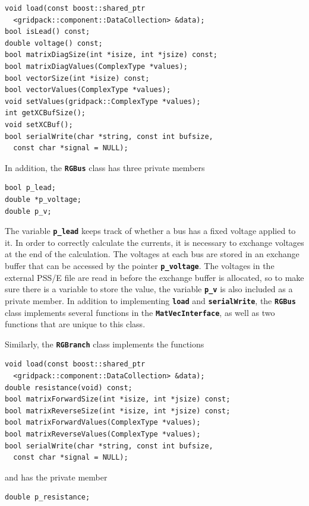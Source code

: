 {
\color{red}
\begin{Verbatim}[fontseries=b]
void load(const boost::shared_ptr
  <gridpack::component::DataCollection> &data);
bool isLead() const;
double voltage() const;
bool matrixDiagSize(int *isize, int *jsize) const;
bool matrixDiagValues(ComplexType *values);
bool vectorSize(int *isize) const;
bool vectorValues(ComplexType *values);
void setValues(gridpack::ComplexType *values);
int getXCBufSize();
void setXCBuf();
bool serialWrite(char *string, const int bufsize,
  const char *signal = NULL);
\end{Verbatim}
}

In addition, the \texttt{\textbf{RGBus}} class has three private members

{
\color{red}
\begin{Verbatim}[fontseries=b]
bool p_lead;
double *p_voltage;
double p_v;
\end{Verbatim}
}

The variable \texttt{\textbf{p\_lead}} keeps track of whether a bus has a fixed voltage applied to it. In order to correctly calculate the currents, it is necessary to exchange voltages at the end of the calculation. The voltages at each bus are stored in an exchange buffer that can be accessed by the pointer \texttt{\textbf{p\_voltage}}. The voltages in the external PSS/E file are read in before the exchange buffer is allocated, so to make sure there is a variable to store the value, the variable \texttt{\textbf{p\_v}} is also included as a private member. In addition to implementing \texttt{\textbf{load}} and \texttt{\textbf{serialWrite}}, the \texttt{\textbf{RGBus}} class implements several functions in the \texttt{\textbf{MatVecInterface}}, as well as two functions that are unique to this class.

Similarly, the \texttt{\textbf{RGBranch}} class implements the functions

{
\color{red}
\begin{Verbatim}[fontseries=b]
void load(const boost::shared_ptr
  <gridpack::component::DataCollection> &data);
double resistance(void) const;
bool matrixForwardSize(int *isize, int *jsize) const;
bool matrixReverseSize(int *isize, int *jsize) const;
bool matrixForwardValues(ComplexType *values);
bool matrixReverseValues(ComplexType *values);
bool serialWrite(char *string, const int bufsize,
  const char *signal = NULL);
\end{Verbatim}
}

and has the private member

{
\color{red}
\begin{Verbatim}[fontseries=b]
double p_resistance;
\end{Verbatim}
}

